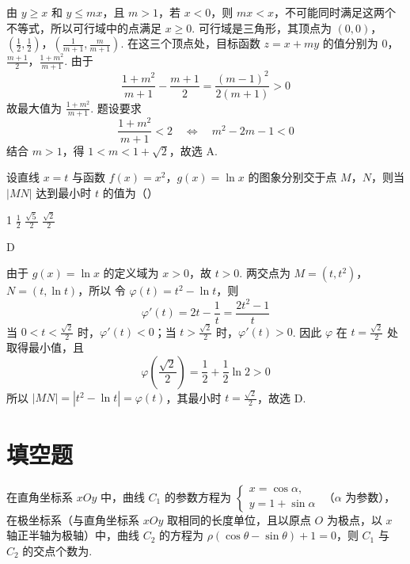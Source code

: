 \begin{solution}
由 \(y\geqslant x\) 和 \(y\leqslant mx\)，且 \(m>1\)，若 \(x<0\)，则 \(mx<x\)，不可能同时满足这两个不等式，所以可行域中的点满足 \(x\geqslant0\). 可行域是三角形，其顶点为
\((0,0)\)，\(\left(\frac12,\frac12\right)\)，\(\left(\frac{1}{m+1},\frac{m}{m+1}\right)\).
在这三个顶点处，目标函数 \(z=x+my\) 的值分别为
\(0\)，\(\frac{m+1}{2}\)，\(\frac{1+m^2}{m+1}\).
由于
\[
\frac{1+m^2}{m+1}-\frac{m+1}{2}=\frac{(m-1)^2}{2(m+1)}>0
\]
故最大值为 \(\frac{1+m^2}{m+1}\). 题设要求
\[
\frac{1+m^2}{m+1}<2
\quad\Longleftrightarrow\quad
m^2-2m-1<0
\]
结合 \(m>1\)，得 \(1<m<1+\sqrt2\)，故选 A.
\end{solution}

\begin{problem}
设直线 \(x = t\) 与函数 \(f(x) = x^2\)，\(g(x) = \ln x\) 的图象分别交于点 \(M\)，\(N\)，则当 \(|MN|\) 达到最小时 \(t\) 的值为（\quad）

\choices
    {1}
    {\( \frac{1}{2} \)}
    {\(\frac{\sqrt{5}}{2}\)}
    {\(\frac{\sqrt{2}}{2}\)}
\end{problem}

\begin{answer}
D
\end{answer}

\begin{solution}
由于 \(g(x)=\ln x\) 的定义域为 \(x>0\)，故 \(t>0\). 两交点为 \(M=(t,t^2)\)，\(N=(t,\ln t)\)，所以
令 \(\varphi(t)=t^2-\ln t\)，则
\[
\varphi'(t)=2t-\frac1t=\frac{2t^2-1}{t}
\]
当 \(0<t<\frac{\sqrt2}{2}\) 时，\(\varphi'(t)<0\)；当 \(t>\frac{\sqrt2}{2}\) 时，\(\varphi'(t)>0\). 因此 \(\varphi\) 在 \(t=\frac{\sqrt2}{2}\) 处取得最小值，且
\[
\varphi\left(\frac{\sqrt2}{2}\right)=\frac12+\frac12\ln2>0
\]
所以 \(|MN|=|t^2-\ln t|=\varphi(t)\)，其最小时 \(t=\frac{\sqrt2}{2}\)，故选 D.
\end{solution}

\section{填空题}

\begin{problem}
在直角坐标系 \(xOy\) 中，曲线 \(C_1\) 的参数方程为 \(\begin{cases}
x = \cos \alpha,\\
y = 1 + \sin \alpha
\end{cases}\) （\(\alpha\) 为参数），在极坐标系（与直角坐标系 \(xOy\) 取相同的长度单位，且以原点 \(O\) 为极点，以 \(x\) 轴正半轴为极轴）中，曲线 \(C_2\) 的方程为 \(\rho (\cos \theta - \sin \theta) + 1 = 0\)，则 \(C_1\) 与 \(C_2\) 的交点个数为\fillinblank{}.
\end{problem}

